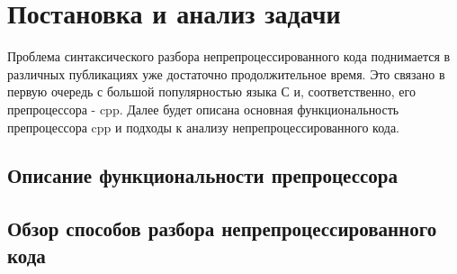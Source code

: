 \clearpage

\section{Постановка и анализ задачи}

Проблема синтаксического разбора непрепроцессированного кода поднимается в различных публикациях уже достаточно продолжительное время. Это связано в первую очередь с большой популярностью языка С и, соответственно, его препроцессора - cpp. Далее будет описана основная функциональность препроцессора cpp и подходы к анализу непрепроцессированного кода.



\subsection{Описание функциональности препроцессора}


\subsection{Обзор способов разбора непрепроцессированного кода}


